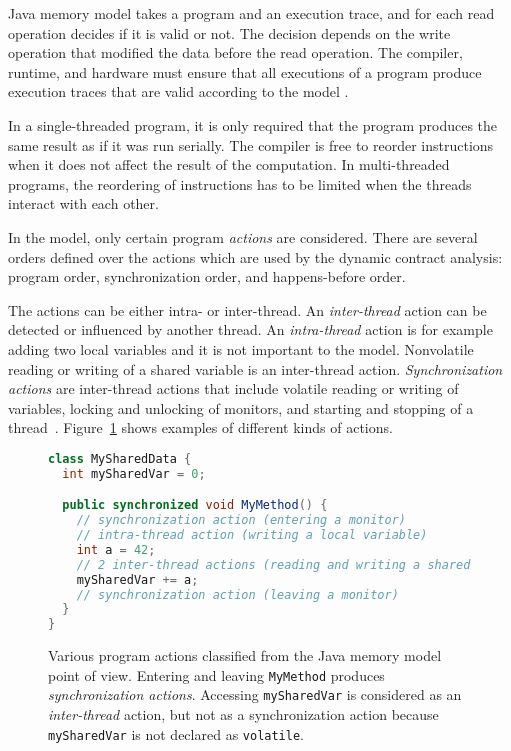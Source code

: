 Java memory model takes a program and an execution trace, and for each read
operation decides if it is valid or not. The decision depends on the write
operation that modified the data before the read operation. The compiler,
runtime, and hardware must ensure that all executions of a program produce
execution traces that are valid according to the model \cite{jmmspec}.

In a single-threaded program, it is only required that the program produces the
same result as if it was run serially. The compiler is free to reorder
instructions when it does not affect the result of the computation. In
multi-threaded programs, the reordering of instructions has to be limited when
the threads interact with each other.

In the model, only certain program \emph{actions} are considered. There are
several orders defined over the actions which are used by the dynamic contract
analysis: program order, synchronization order, and happens-before order.

The actions can be either intra- or inter-thread. An \emph{inter-thread} action
can be detected or influenced by another thread. An \emph{intra-thread} action
is for example adding two local variables and it is not important to the model.
Nonvolatile reading or writing of a shared variable is an inter-thread action.
\emph{Synchronization actions} are inter-thread actions that include volatile
reading or writing of variables, locking and unlocking of monitors, and starting
and stopping of a thread~\cite{jmmspec}. Figure~\ref{threadActions} shows
examples of different kinds of actions.

\begin{figure}[hbt]
    \label{threadActions}
\begin{lstlisting}[language=java]
class MySharedData {
  int mySharedVar = 0;

  public synchronized void MyMethod() {
    // synchronization action (entering a monitor)
    // intra-thread action (writing a local variable)
    int a = 42;
    // 2 inter-thread actions (reading and writing a shared variable)
    mySharedVar += a;
    // synchronization action (leaving a monitor)
  }
}
\end{lstlisting}
    \caption{Various program actions classified from the Java memory model point
    of view. Entering and leaving \texttt{MyMethod} produces
    \emph{synchronization actions}. Accessing \texttt{mySharedVar} is considered
    as an \emph{inter-thread} action, but not as a synchronization action
    because \texttt{mySharedVar} is not declared as \texttt{volatile}.}
\end{figure}


